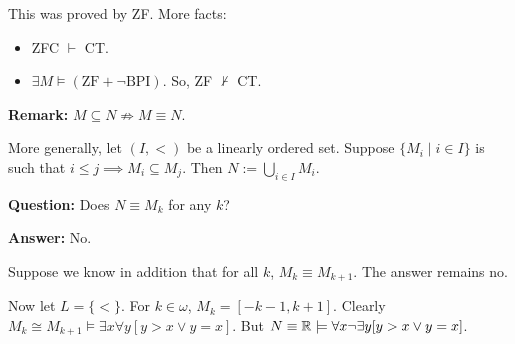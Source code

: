 \documentclass{report}
\begin{document}
\noindent This was proved by ZF. More facts:
\begin{itemize}
    \item ZFC $\vdash$ CT.
    \item $\exists M \models (\text{ZF} + \neg\text{BPI})$. So, ZF $\not\vdash$ CT.
\end{itemize}

\noindent \textbf{Remark:} $M \subseteq N \not\Rightarrow M \equiv N$.

More generally, let $(I, <)$ be a linearly ordered set. Suppose $\{ M_i \mid i \in I\}$ is such that $i \leq j \implies M_i \subseteq M_j$. Then $N := \bigcup_{i \in I} M_i$.

\noindent \textbf{Question:} Does $N \equiv M_k$ for any $k$?

\noindent \textbf{Answer:} No.

Suppose we know in addition that for all $k$, $M_k \equiv M_{k+1}$. The answer remains no.

Now let $L = \{ < \}$. For $k \in \omega$, $M_k = [-k - 1, k + 1]$. Clearly $M_k \cong M_{k+1} \models \exists x \forall y [ y > x \vee y = x]$. But $N \equiv \RR \models \forall x \neg \exists y [ y > x \vee y = x]$.

\end{document}
